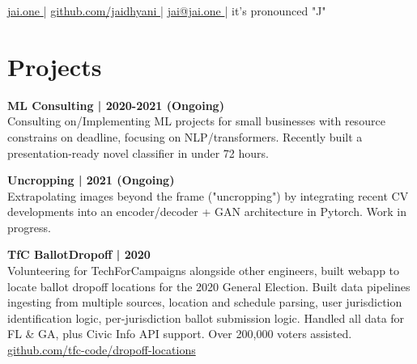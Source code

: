 \documentclass[]{resume}
\begin{document}
%
%
\lastupdated
\github

%
%
{ 
    \href{http://jai.one }{jai.one }|
    \href{http://github.com/jaidhyani}{ github.com/jaidhyani }|
    \href{mailto:jai@jai.one}{ jai@jai.one }|
    it's pronounced "J"
}

%
%

\begin{minipage}[t]{0.33\textwidth}



\sectionsep


\section{Projects}

\sectionsep

\textbf{ML Consulting | 2020-2021 (Ongoing)}\\
Consulting on/Implementing ML projects for small businesses with
resource constrains on deadline, focusing on NLP/transformers. 
Recently built a presentation-ready novel classifier in under 72 hours.
\sectionsep


\textbf{Uncropping | 2021 (Ongoing)}\\
Extrapolating images beyond the frame ("uncropping") by integrating recent CV developments
into an encoder/decoder + GAN architecture in Pytorch. Work in progress.
\sectionsep

\textbf{TfC BallotDropoff | 2020}\\
Volunteering for TechForCampaigns alongside other engineers, 
built webapp to locate  ballot dropoff locations for 
the 2020 General Election. Built data pipelines ingesting from 
multiple sources, location and schedule parsing, user jurisdiction 
identification logic, per-jurisdiction ballot submission logic. 
Handled all data for FL \& GA, plus Civic Info API support. Over 
200,000 voters assisted.\\
\href{https://github.com/tfc-code/dropoff-locations}{\quad github.com/tfc-code/dropoff-locations}
\sectionsep


\end{minipage}
\end{document}
